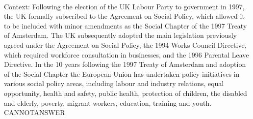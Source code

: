 \documentclass[11pt,a4paper, onecolumn]{article}
\begin{document}
\\ Context: Following the election of the UK Labour Party to government in 1997, the UK formally subscribed to the Agreement on Social Policy, which allowed it to be included with minor amendments as the Social Chapter of the 1997 Treaty of Amsterdam. The UK subsequently adopted the main legislation previously agreed under the Agreement on Social Policy, the 1994 Works Council Directive, which required workforce consultation in businesses, and the 1996 Parental Leave Directive. In the 10 years following the 1997 Treaty of Amsterdam and adoption of the Social Chapter the European Union has undertaken policy initiatives in various social policy areas, including labour and industry relations, equal opportunity, health and safety, public health, protection of children, the disabled and elderly, poverty, migrant workers, education, training and youth. CANNOTANSWER
\end{document}
